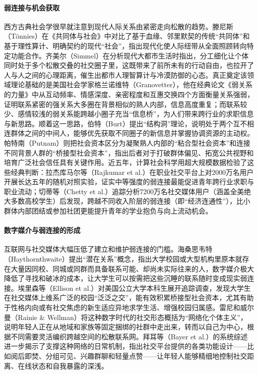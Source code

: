 \paragraph{弱连接与机会获取}
西方古典社会学很早就注意到现代人际关系由紧密走向松散的趋势。滕尼斯（Tönnies）在《共同体与社会》中对比了基于血缘、邻里默契的传统“共同体”和基于理性算计、明确契约的现代“社会”，指出现代化使人际纽带从全面照顾转向特定功能合作\cite{Tonnies2019}。齐美尔（Simmel）在分析现代大都市生活时指出，分工细化让个体同时处于多个松散交叠的社交圈子里，这既带来了前所未有的行动自由，也拉开了人与人之间的心理距离，催生出都市人理智算计与冷漠防御的心态\cite{Simmel2002}。真正奠定该领域理论基础的是美国社会学家格兰诺维特（Granovetter），他在经典论文《弱关系的力量》中从互动频率、情感深度、亲密程度和互惠交换四个方面衡量关系强弱，证明联系紧密的强关系大多圈在背景相似的熟人内部，信息高度重复；而联系较少、感情较浅的弱关系能跨越小圈子充当“信息桥”，为人们带来跨行业的求职信息与新思路\cite{Granovetter1973}。顺着这一思路，伯特（Burt）提出“结构洞”理论，说明处于两个互不相连群体之间的中间人，能够优先获取不同圈子的新信息并掌握协调资源的主动权\cite{Burt1992}。帕特南（Putnam）则把社会资本区分为凝聚熟人内部的“粘合型社会资本”和连接不同背景人群的“桥接型社会资本”，指出后者对于打破群体偏见、拓宽公共视野和培育广泛社会信任具有关键作用\cite{Putnam2000}。近五年，计算社会科学用超大规模数据检验了这些经典判断：拉杰库马尔等（Rajkumar et al.）在职业社交平台上对2000万名用户开展长达五年的随机对照实验，证实中等强度的弱连接最能促进青年跨行业求职与职业流动\cite{Rajkumar2022}；切蒂等（Chetty et al.）追踪分析7200万名社交媒体用户（涵盖全美绝大多数高校学生）后发现，跨越不同收入阶层的弱连接（即“经济连通性”），比小群体内部团结或参加社团更能提升青年的学业抱负与向上流动机会\cite{Chetty2022}。

\paragraph{数字媒介与弱连接的形成}
互联网与社交媒体大幅压低了建立和维护弱连接的门槛。海桑思韦特（Haythornthwaite）提出“潜在关系”概念，指出大学校园或大型机构里原本就存在大量因同校、同城或同群而具备联系可能、却尚未实际往来的人，数字媒介极大降低了寻找和破冰的成本，让大学生可以按需把这些沉睡的联系随时变成现实弱连接\cite{Haythornthwaite2005}。埃里森等（Ellison et al.）对美国公立大学本科生展开追踪调查，发现大学生在社交媒体上维系广泛的校园“泛泛之交”，能有效积累桥接型社会资本，尤其有助于性格内向或有社交焦虑的新生适应异地求学生活、增强校园归属感\cite{Ellison2007}。雷尼和威尔曼（Rainie \& Wellman）将这种数字时代的社交形态概括为“网络化个体主义”，说明年轻人正在从地域和家族等固定捆绑的社群中走出来，转而以自己为中心，根据不同需要灵活编织跨越空间的松散联系网\cite{Rainie2012}。拜耳等（Bayer et al.）的系统综述进一步揭示了支撑这种网络的日常机制，指出社交平台提供的各类功能设计——比如阅后即焚、分组可见、兴趣群聊和轻量点赞——让年轻人能够精细地控制社交距离、在线状态和自我暴露的深浅\cite{Bayer2020}。


